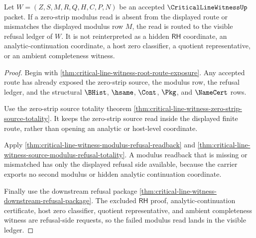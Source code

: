 \begin{theorem}
\label{thm:critical-line-witness-zero-strip-modulus-refusal}
Let $W=(Z,S,M,R,Q,H,C,P,N)$ be an accepted $\CriticalLineWitnessUp$ packet. If a zero-strip modulus read is absent from the displayed route or mismatches the displayed modulus row $M$, the read is routed to the visible refusal ledger of $W$. It is not reinterpreted as a hidden $\mathsf{RH}$ coordinate, an analytic-continuation coordinate, a host zero classifier, a quotient representative, or an ambient completeness witness.
\end{theorem}
\begin{proof}
Begin with \autoref{thm:critical-line-witness-root-route-exposure}. Any accepted route has already exposed the zero-strip source, the modulus row, the refusal ledger, and the structural $\BHist$, $\hsame$, $\Cont$, $\Pkg$, and $\NameCert$ rows.

Use the zero-strip source totality theorem \autoref{thm:critical-line-witness-zero-strip-source-totality}. It keeps the zero-strip source read inside the displayed finite route, rather than opening an analytic or host-level coordinate.

Apply \autoref{thm:critical-line-witness-modulus-refusal-readback} and \autoref{thm:critical-line-witness-source-modulus-refusal-totality}. A modulus readback that is missing or mismatched has only the displayed refusal side available, because the carrier exports no second modulus or hidden analytic continuation coordinate.

Finally use the downstream refusal package \autoref{thm:critical-line-witness-downstream-refusal-package}. The excluded $\mathsf{RH}$ proof, analytic-continuation certificate, host zero classifier, quotient representative, and ambient completeness witness are refusal-side requests, so the failed modulus read lands in the visible ledger.
\end{proof}


